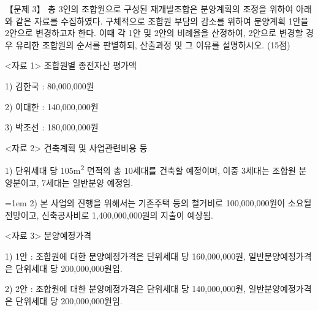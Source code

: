 \begin{longquestion}{【문제 3】}
총 3인의 조합원으로 구성된 재개발조합은 분양계획의 조정을 위하여 아래와 같은 자료를 수집하였다. 구체적으로 조합원 부담의 감소를 위하여 분양계획 1안을 2안으로 변경하고자 한다. 이때 각 1안 및 2안의 비례율을 산정하여, 2안으로 변경할 경우 유리한 조합원의 순서를 판별하되, 산출과정 및 그 이유를 설명하시오. (15점) \par
<자료 1> 조합원별 종전자산 평가액 \par
1) 김한국 : 80,000,000원 \par
2) 이대한 : 140,000,000원 \par
3) 박조선 : 180,000,000원 \par
<자료 2> 건축계획 및 사업관련비용 등 \par
1) 단위세대 당 105m\textsuperscript{2} 면적의 총 10세대를 건축할 예정이며, 이중 3세대는 조합원 분양분이고, 7세대는 일반분양 예정임. \par
{\emergencystretch=1em
2) 본 사업의 진행을 위해서는 기존주택 등의 철거비로 100,000,000원이 소요될 전망이고, 신축공사비로 1,400,000,000원의 지출이 예상됨. \par}
<자료 3> 분양예정가격 \par
1) 1안 : 조합원에 대한 분양예정가격은 단위세대 당 160,000,000원, 일반분양예정가격은 단위세대 당 200,000,000원임. \par
2) 2안 : 조합원에 대한 분양예정가격은 단위세대 당 140,000,000원, 일반분양예정가격은 단위세대 당 200,000,000원임. \par
\end{longquestion}
